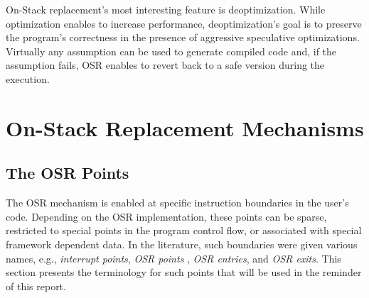 On-Stack replacement's most interesting feature is deoptimization. 
While optimization enables to increase performance, deoptimization's goal is to preserve the program's correctness in the presence of aggressive speculative optimizations. 
Virtually any assumption can be used to generate compiled code and, if the assumption fails, 
OSR enables to revert back to a safe version during the execution.\\

\section{On-Stack Replacement Mechanisms}

\subsection{The OSR Points}
The OSR mechanism is enabled at specific instruction boundaries in the user's code.
Depending on the OSR implementation, these points can be sparse, restricted to special points in the program control flow, or associated with special framework dependent data.
In the literature, such boundaries were given various names, e.g., \textit{interrupt points}\cite{holzle1992debugging}, \textit{OSR points} \cite{fink2003design, holzle1992debugging, WebKitURL, lameed2013modular}, \textit{OSR entries}, and \textit{OSR exits}\cite{WebKitURL, lameed2013modular}.
This section presents the terminology for such points that will be used in the reminder of this report.

